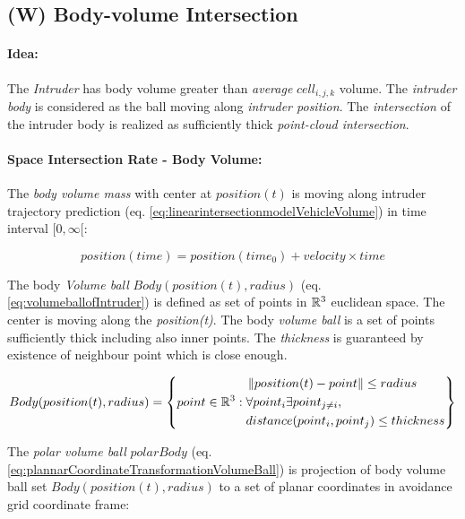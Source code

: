 \subsection{(W) Body-volume Intersection}\label{s:bodyvolumeIntersection}
\paragraph{Idea:} The \emph{Intruder} has \empty body volume greater than \emph{average} $cell_{i,j,k}$ volume. The \emph{intruder body} is considered as the ball moving along \emph{intruder position}. The \emph{intersection} of the intruder body is realized as sufficiently thick \emph{point-cloud intersection}.

\paragraph{Space Intersection Rate - Body Volume:} The \emph{body volume mass} with center at $position(t)$ is moving along intruder trajectory prediction (eq. \ref{eq:linearintersectionmodelVehicleVolume}) in time interval $[0,\infty[$:

\begin{equation}\label{eq:linearintersectionmodelVehicleVolume}
    position(time) = position(time_0) + velocity \times time
\end{equation}

\noindent The body \emph{Volume ball} $Body(position(t),radius)$ (eq. \ref{eq:volumeballofIntruder}) is defined as set of points in $\mathbb{R}^3$ euclidean space. The center is moving along the \emph{position(t)}. The body \emph{volume ball} is a set of points sufficiently thick including also inner points. The \emph{thickness} is guaranteed by existence of neighbour point which is close enough.

\begin{equation}\label{eq:volumeballofIntruder}
    Body(position(t),radius) = \left\{point \in \mathbb{R}^3:\begin{aligned}&\left\lVert position(t) - point\right\rVert \le radius\\ &\forall point_i \exists point_{j\neq i},\\ &distance(point_i,point_j)\le thickness\end{aligned} \right\}
\end{equation}

\noindent The \emph{polar volume ball} $polarBody$ (eq. \ref{eq:plannarCoordinateTransformationVolumeBall}) is projection of body volume ball  set $Body(position(t),radius)$ to a set of planar coordinates in avoidance grid coordinate frame:

